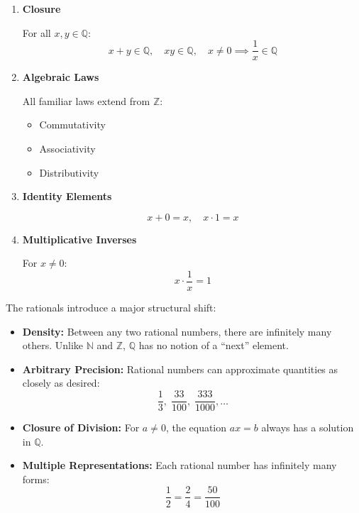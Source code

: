 \documentclass[11pt]{article}
\newcommand{\N}{\mathbb{N}}
\newcommand{\Z}{\mathbb{Z}}
\newcommand{\Q}{\mathbb{Q}}
\begin{document}
\begin{theorybox}
\begin{enumerate}
This preserves the structure of solving equations of the form $ax = b$.

\item \textbf{Closure}

For all $x,y \in \Q$:
\[
x+y \in \Q, \quad xy \in \Q, \quad x \neq 0 \implies \frac{1}{x} \in \Q
\]

\item \textbf{Algebraic Laws}

All familiar laws extend from $\Z$:

\begin{itemize}
    \item Commutativity
    \item Associativity
    \item Distributivity
\end{itemize}

\item \textbf{Identity Elements}

\[
x + 0 = x, \quad x \cdot 1 = x
\]

\item \textbf{Multiplicative Inverses}

For $x \neq 0$:
\[
x \cdot \frac{1}{x} = 1
\]

\end{enumerate}

\end{theorybox}

\begin{remarkbox}

The rationals introduce a major structural shift:

\begin{itemize}

\item \textbf{Density:}  
Between any two rational numbers, there are infinitely many others.  
Unlike $\N$ and $\Z$, $\Q$ has no notion of a “next” element.

\item \textbf{Arbitrary Precision:}  
Rational numbers can approximate quantities as closely as desired:
\[
\frac{1}{3},\; \frac{33}{100},\; \frac{333}{1000}, \dots
\]

\item \textbf{Closure of Division:}  
For $a \neq 0$, the equation $ax = b$ always has a solution in $\Q$.

\item \textbf{Multiple Representations:}  
Each rational number has infinitely many forms:
\[
\frac{1}{2} = \frac{2}{4} = \frac{50}{100}
\]

\end{itemize}

\end{remarkbox}
\end{document}
